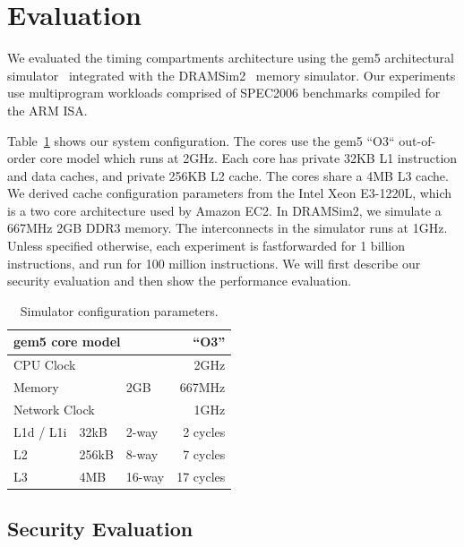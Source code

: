 \section{Evaluation}

We evaluated the timing compartments architecture using the gem5 architectural 
simulator~\cite{gem5} integrated with the DRAMSim2~\cite{DRAMSim2} 
memory simulator. Our experiments use multiprogram workloads 
comprised of SPEC2006 benchmarks compiled for the ARM ISA. 

Table~\ref{tab:config} shows our system configuration.
The cores use the gem5 ``O3`` out-of-order core model which runs at 2GHz. 
Each core has private 32KB L1 instruction and data caches, and private 256KB L2 
cache. The cores share a 4MB L3 cache. We derived cache configuration 
parameters from the Intel Xeon E3-1220L, which is a two core architecture used 
by Amazon EC2. In DRAMSim2, we simulate a 667MHz 2GB DDR3 memory. The 
interconnects in the simulator runs at 1GHz. Unless specified otherwise, each experiment is 
fastforwarded for 1 billion instructions, and run for 100 million 
instructions. We will first describe our security evaluation and then show
the performance evaluation.

\begin{table}
    \caption{Simulator configuration parameters.}
    \centering
    \begin{tabular}{|l|l|l|r|}
        \hline
        \multicolumn{3}{|l|}{gem5 core model} & ``O3''        \\\hline
        \multicolumn{3}{|l|}{CPU Clock}    & 2GHz             \\\hline
        \hline
        \multicolumn{2}{|l|}{Memory}             & 2GB    & 667MHz  \\\hline
        \hline
        \multicolumn{3}{|l|}{Network Clock}      & 1GHz \\\hline
        \hline
        L1d / L1i  & 32kB   & 2-way  & 2 cycles\\\hline
        L2         & 256kB  & 8-way  & 7 cycles \\\hline
        L3         & 4MB    & 16-way & 17 cycles  \\\hline
    \end{tabular}
    \label{tab:config}
\end{table}

\subsection{Security Evaluation}


